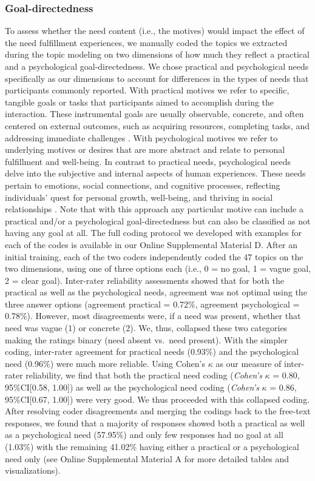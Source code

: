 \subsubsection{Goal-directedness}

To assess whether the need content (i.e., the motives) would impact the
effect of the need fulfillment experiences, we manually coded the topics
we extracted during the topic modeling on two dimensions of how much
they reflect a practical and a psychological goal-directedness. We chose
practical and psychological needs specifically as our dimensions to
account for differences in the types of needs that participants commonly
reported. With practical motives we refer to specific, tangible goals or
tasks that participants aimed to accomplish during the interaction.
These instrumental goals are usually observable, concrete, and often
centered on external outcomes, such as acquiring resources, completing
tasks, and addressing immediate challenges \citep[][]{}. With
psychological motives we refer to underlying motives or desires that are
more abstract and relate to personal fulfillment and well-being. In
contrast to practical needs, psychological needs delve into the
subjective and internal aspects of human experiences. These needs
pertain to emotions, social connections, and cognitive processes,
reflecting individuals' quest for personal growth, well-being, and
thriving in social relationships \citep[][]{}. Note that with this
approach any particular motive can include a practical and/or a
psychological goal-directedness but can also be classified as not having
any goal at all. The full coding protocol we developed with examples for
each of the codes is available in our Online Supplemental Material D.
After an initial training, each of the two coders independently coded
the 47 topics on the two dimensions, using one of three options each
(i.e., 0 = no goal, 1 = vague goal, 2 = clear goal). Inter-rater
reliability assessments showed that for both the practical as well as
the psychological needs, agreement was not optimal using the three
answer options (agreement practical = 0.72\%, agreement psychological =
0.78\%). However, most disagreements were, if a need was present,
whether that need was vague (1) or concrete (2). We, thus, collapsed
these two categories making the ratings binary (need absent vs.~need
present). With the simpler coding, inter-rater agreement for practical
needs (0.93\%) and the psychological need (0.96\%) were much more
reliable. Using Cohen's \(\kappa\) as our measure of inter-rater
reliability, we find that both the practical need coding
(\textit{Cohen's} \(\kappa\) = 0.80, 95\%CI{[}0.58, 1.00{]}) as well as
the psychological need coding (\textit{Cohen's} \(\kappa\) = 0.86,
95\%CI{[}0.67, 1.00{]}) were very good. We thus proceeded with this
collapsed coding. After resolving coder disagreements and merging the
codings back to the free-text responses, we found that a majority of
responses showed both a practical as well as a psychological need
(57.95\%) and only few responses had no goal at all (1.03\%) with the
remaining 41.02\% having either a practical or a psychological need only
(see Online Supplemental Material A for more detailed tables and
visualizations).

